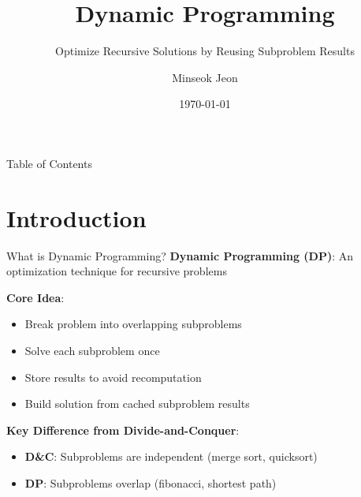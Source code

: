 \documentclass[aspectratio=169]{beamer}
\title{Dynamic Programming}
\subtitle{Optimize Recursive Solutions by Reusing Subproblem Results}
\author{Minseok Jeon}
\institute{DGIST}
\date{\today}
\begin{document}
\begin{frame}
  \titlepage
\end{frame}

\begin{frame}{Table of Contents}
  \tableofcontents
\end{frame}

\section{Introduction}

\begin{frame}{What is Dynamic Programming?}
  \textbf{Dynamic Programming (DP)}: An optimization technique for recursive problems

  \vspace{0.5cm}

  \textbf{Core Idea}:
  \begin{itemize}
    \item Break problem into overlapping subproblems
    \item Solve each subproblem once
    \item Store results to avoid recomputation
    \item Build solution from cached subproblem results
  \end{itemize}

  \vspace{0.5cm}

  \textbf{Key Difference from Divide-and-Conquer}:
  \begin{itemize}
    \item \textbf{D\&C}: Subproblems are independent (merge sort, quicksort)
    \item \textbf{DP}: Subproblems overlap (fibonacci, shortest path)
  \end{itemize}
\end{frame}
\end{document}
